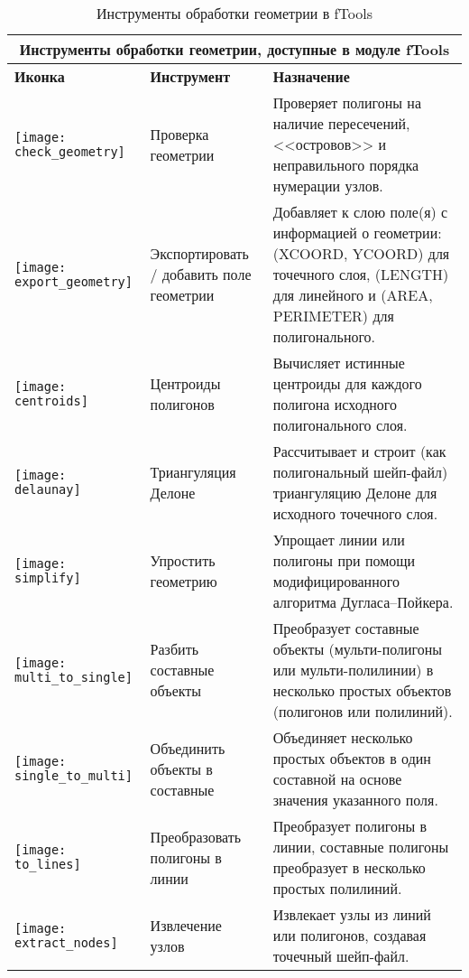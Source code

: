 \begin{table}[ht]
\centering
\begin{tabular}{|m{1cm}|m{4cm}|m{9cm}|}
 \hline \multicolumn{3}{|c|}{\textbf{Инструменты обработки геометрии, доступные в  модуле fTools}} \\
 \hline \textbf{Иконка} & \textbf{Инструмент} & \textbf{Назначение} \\
 \hline \texttt{[image: check\_geometry]} & Проверка геометрии &
 Проверяет полигоны на наличие пересечений, <<островов>> и неправильного порядка нумерации узлов. \\
 \hline \texttt{[image: export\_geometry]} & Экспортировать / добавить поле
 геометрии & Добавляет к слою поле(я) с информацией о геометрии: (XCOORD, YCOORD) для точечного
 слоя, (LENGTH) для линейного и (AREA, PERIMETER) для полигонального. \\
 \hline \texttt{[image: centroids]} & Центроиды полигонов &
 Вычисляет истинные центроиды для каждого полигона исходного полигонального слоя. \\
 \hline \texttt{[image: delaunay]} & Триангуляция Делоне &
 Рассчитывает и строит (как полигональный шейп-файл) триангуляцию Делоне для исходного точечного слоя. \\
 \hline \texttt{[image: simplify]} & Упростить геометрию &
 Упрощает линии или полигоны при помощи модифицированного алгоритма Дугласа--Пойкера. \\
 \hline \texttt{[image: multi\_to\_single]} & Разбить составные
 объекты & Преобразует составные объекты (мульти-полигоны или мульти-полилинии)
 в несколько простых объектов (полигонов или полилиний). \\
 \hline \texttt{[image: single\_to\_multi]} & Объединить
 объекты в составные & Объединяет несколько простых объектов в один составной
 на основе значения указанного поля. \\
 \hline \texttt{[image: to\_lines]} & Преобразовать полигоны в линии
 & Преобразует полигоны в линии, составные полигоны преобразует в несколько простых полилиний. \\
 \hline \texttt{[image: extract\_nodes]} & Извлечение узлов &
 Извлекает узлы из линий или полигонов, создавая точечный шейп-файл. \\
 \hline
\end{tabular}
\caption{Инструменты обработки геометрии в fTools}\label{tab:ftool_geometry}
\end{table}

